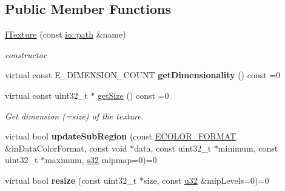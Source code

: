\subsection*{Public Member Functions}
\begin{DoxyCompactItemize}
\item 
\hyperlink{classirr_1_1video_1_1ITexture_a32dbd62fef8a65f11e5b440706346c90}{I\+Texture} (const \hyperlink{namespaceirr_1_1io_ab1bdc45edb3f94d8319c02bc0f840ee1}{io\+::path} \&name)\hypertarget{classirr_1_1video_1_1ITexture_a32dbd62fef8a65f11e5b440706346c90}{}\label{classirr_1_1video_1_1ITexture_a32dbd62fef8a65f11e5b440706346c90}

\begin{DoxyCompactList}\small\item\em constructor \end{DoxyCompactList}\item 
virtual const E\+\_\+\+D\+I\+M\+E\+N\+S\+I\+O\+N\+\_\+\+C\+O\+U\+NT {\bfseries get\+Dimensionality} () const  =0\hypertarget{classirr_1_1video_1_1ITexture_ac434c6d3115aba97b1030e162dcca53b}{}\label{classirr_1_1video_1_1ITexture_ac434c6d3115aba97b1030e162dcca53b}

\item 
virtual const uint32\+\_\+t $\ast$ \hyperlink{classirr_1_1video_1_1ITexture_ae42f21caf68848160b70092b05c2026b}{get\+Size} () const  =0
\begin{DoxyCompactList}\small\item\em Get dimension (=size) of the texture. \end{DoxyCompactList}\item 
virtual bool {\bfseries update\+Sub\+Region} (const \hyperlink{namespaceirr_1_1video_a1d5e487888c32b1674a8f75116d829ed}{E\+C\+O\+L\+O\+R\+\_\+\+F\+O\+R\+M\+AT} \&in\+Data\+Color\+Format, const void $\ast$data, const uint32\+\_\+t $\ast$minimum, const uint32\+\_\+t $\ast$maximum, \hyperlink{namespaceirr_ac66849b7a6ed16e30ebede579f9b47c6}{s32} mipmap=0)=0\hypertarget{classirr_1_1video_1_1ITexture_ac18e534a9bd7f9713b3f4831acdd8ee4}{}\label{classirr_1_1video_1_1ITexture_ac18e534a9bd7f9713b3f4831acdd8ee4}

\item 
virtual bool {\bfseries resize} (const uint32\+\_\+t $\ast$size, const \hyperlink{namespaceirr_a0416a53257075833e7002efd0a18e804}{u32} \&mip\+Levels=0)=0\hypertarget{classirr_1_1video_1_1ITexture_a7e029f557f9718b4f794764f8d4b0986}{}\label{classirr_1_1video_1_1ITexture_a7e029f557f9718b4f794764f8d4b0986}


\end{DoxyCompactItemize}
